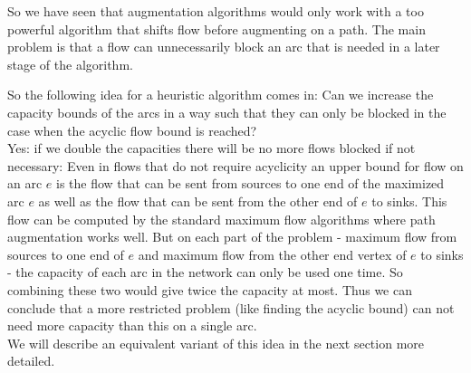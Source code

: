 So we have seen that augmentation algorithms would only work with a too powerful algorithm that shifts flow before 
augmenting on a path. The main problem is that a flow can unnecessarily block an arc that is needed in a later stage 
of the algorithm. 

So the following idea for a heuristic algorithm comes in: Can we increase the capacity bounds of the arcs in a way 
such that they can only be blocked in the case when the acyclic flow bound is reached?\\

Yes: if we double the capacities there will be no more flows blocked if not necessary: Even in flows that do not 
require acyclicity an upper bound for flow on an arc $e$ is the flow that can be sent from sources to one end of the 
maximized arc $e$ as well as the flow that can be sent from the other end of $e$ to sinks. This flow can be computed by 
the standard maximum flow algorithms where path augmentation works well. But on each part of the problem - maximum flow 
from sources to one end of $e$ and maximum flow from the other end vertex of $e$ to sinks - the capacity of each arc in 
the network can only be used one time. So combining these two would give twice the capacity at most. Thus we can 
conclude that a more restricted problem (like finding the acyclic bound) can not need more capacity than this on a 
single arc.\\

We will describe an equivalent variant of this idea in the next section more detailed.


